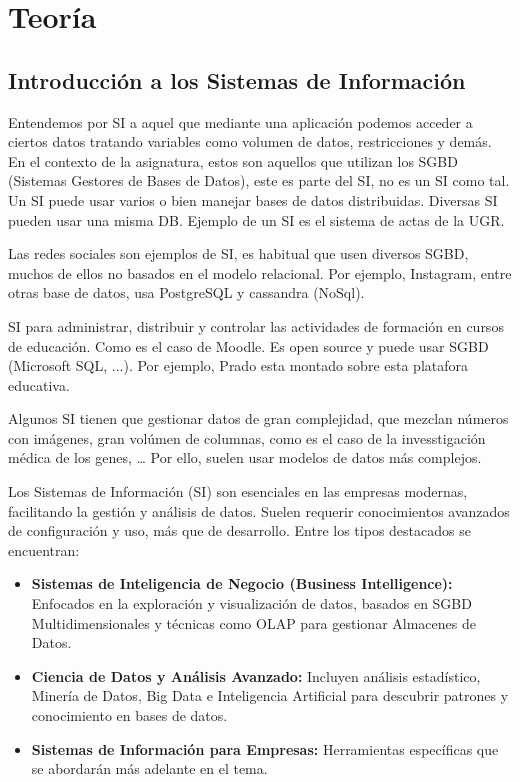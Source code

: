 \documentclass[12pt]{book} %
\providecommand{\tightlist}{%
  \setlength{\itemsep}{0pt}\setlength{\parskip}{0pt}}
\begin{document}
\part{Teoría}

\hypertarget{introducciuxf3n-a-los-sistemas-de-informaciuxf3n}{%
\chapter{Introducción a los Sistemas de
Información}\label{introducciuxf3n-a-los-sistemas-de-informaciuxf3n}}

\begin{definicion}
Entendemos por SI a aquel que mediante una aplicación podemos acceder a ciertos datos tratando variables como volumen de datos, restricciones y demás. En el contexto de la asignatura, estos son aquellos que utilizan los SGBD (Sistemas Gestores de Bases de Datos), este es parte del SI, no es un SI como tal. Un SI puede usar varios o bien manejar bases de datos distribuidas. Diversas SI pueden usar una misma DB. Ejemplo de un SI es el sistema de actas de la UGR.
\end{definicion}

Las redes sociales son ejemplos de SI, es habitual que usen diversos
SGBD, muchos de ellos no basados en el modelo relacional. Por ejemplo,
Instagram, entre otras base de datos, usa PostgreSQL y cassandra
(NoSql).

\begin{definicion}
SI para administrar, distribuir y controlar las actividades de formación en cursos de educación. Como es el caso de Moodle. Es open source y puede usar SGBD (Microsoft SQL, ...). Por ejemplo, Prado esta montado sobre esta platafora educativa.
\end{definicion}

Algunos SI tienen que gestionar datos de gran complejidad, que mezclan
números con imágenes, gran volúmen de columnas, como es el caso de la
invesstigación médica de los genes, \ldots{} Por ello, suelen usar
modelos de datos más complejos.

Los Sistemas de Información (SI) son esenciales en las empresas
modernas, facilitando la gestión y análisis de datos. Suelen requerir
conocimientos avanzados de configuración y uso, más que de desarrollo.
Entre los tipos destacados se encuentran:

\begin{itemize}
\tightlist
\item
  \textbf{Sistemas de Inteligencia de Negocio (Business Intelligence):}
  Enfocados en la exploración y visualización de datos, basados en SGBD
  Multidimensionales y técnicas como OLAP para gestionar Almacenes de
  Datos.
\item
  \textbf{Ciencia de Datos y Análisis Avanzado:} Incluyen análisis
  estadístico, Minería de Datos, Big Data e Inteligencia Artificial para
  descubrir patrones y conocimiento en bases de datos.
\item
  \textbf{Sistemas de Información para Empresas:} Herramientas
  específicas que se abordarán más adelante en el tema.
\end{itemize}
\end{document}
